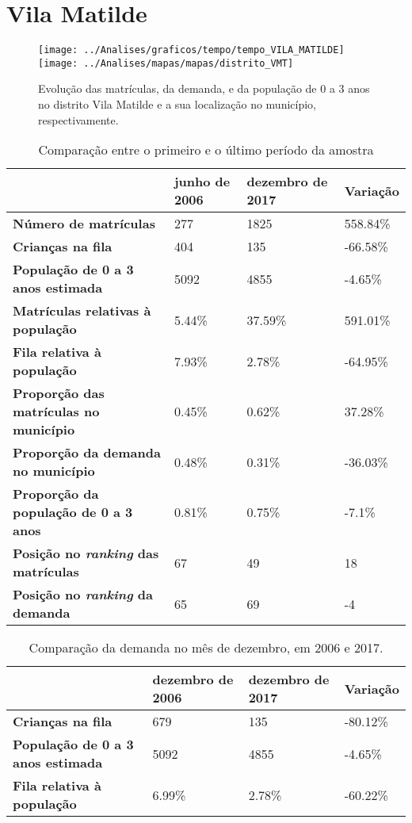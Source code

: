\section{Vila Matilde}
\begin{figure}[H]
\centering
\texttt{[image: ../Analises/graficos/tempo/tempo\_VILA\_MATILDE]}
\texttt{[image: ../Analises/mapas/mapas/distrito\_VMT]}
\caption{Evolução das matrículas, da demanda, e da população de 0 a 3 anos no distrito Vila Matilde e a sua localização no município, respectivamente.}
\end{figure}
\begin{table}[H]
\begin{tabular}{l|l|l|l}
\textbf{}                                      & \textbf{junho de 2006}       & \textbf{dezembro de 2017}    & \textbf{Variação} \\ \hline
\textbf{Número de matrículas}                  & 277 & 1825 & 558.84\% \\ \hline
\textbf{Crianças na fila}                      & 404 & 135 & -66.58\% \\ \hline
\textbf{População de 0 a 3 anos estimada}      & 5092 & 4855 & -4.65\% \\ \hline
\textbf{Matrículas relativas à população}      & 5.44\% & 37.59\% & 591.01\% \\ \hline
\textbf{Fila relativa à população}             & 7.93\% & 2.78\% & -64.95\% \\ \hline
\textbf{Proporção das matrículas no município} & 0.45\% & 0.62\% & 37.28\% \\ \hline
\textbf{Proporção da demanda no município}     & 0.48\% & 0.31\% & -36.03\% \\ \hline
\textbf{Proporção da população de 0 a 3 anos}  & 0.81\% & 0.75\% & -7.1\% \\ \hline
\textbf{Posição no \textit{ranking} das matrículas}     & 67 & 49 & 18 \\ \hline
\textbf{Posição no \textit{ranking} da demanda}         & 65 & 69 & -4 \\ 
\end{tabular}
\caption{Comparação entre o primeiro e o último período da amostra}
\end{table}
\begin{table}[H]
\begin{tabular}{l|l|l|l}
\textbf{}                                 & \textbf{dezembro de 2006} & \textbf{dezembro de 2017} & \textbf{Variação} \\ \hline
\textbf{Crianças na fila}                      & 679 & 135 & -80.12\% \\ \hline
\textbf{População de 0 a 3 anos estimada}      & 5092 & 4855 & -4.65\% \\ \hline
\textbf{Fila relativa à população}             & 6.99\% & 2.78\% & -60.22\% \\
\end{tabular}
\caption{Comparação da demanda no mês de dezembro, em 2006 e 2017.}
\end{table}
